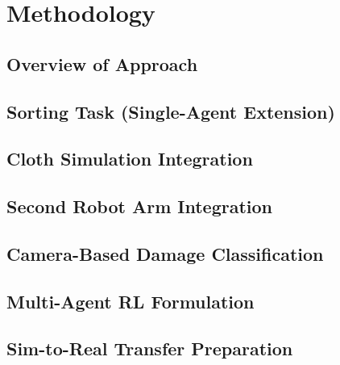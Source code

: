 \chapter{Methodology}\label{ch:methodology}

\section{Overview of Approach}

\section{Sorting Task (Single-Agent Extension)}

\section{Cloth Simulation Integration}

\section{Second Robot Arm Integration}

\section{Camera-Based Damage Classification}

\section{Multi-Agent RL Formulation}

\section{Sim-to-Real Transfer Preparation}
